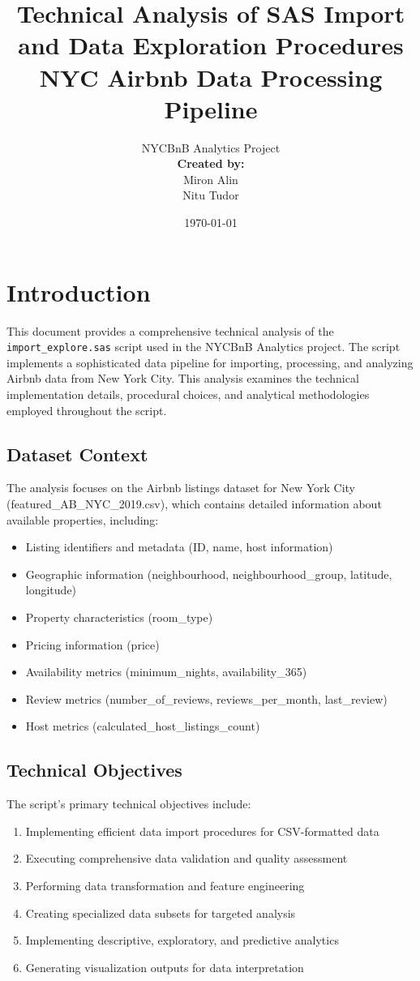 \documentclass{article}
\title{\textbf{Technical Analysis of SAS Import and Data Exploration Procedures}\\
\Large{NYC Airbnb Data Processing Pipeline}}
\author{NYCBnB Analytics Project\\
\vspace{2cm}
{\large\textbf{Created by:}\\
\vspace{0.5cm}
\large Miron Alin\\
\large Nitu Tudor}}
\date{\today}
\begin{document}
\maketitle
\tableofcontents
\newpage

\section{Introduction}
This document provides a comprehensive technical analysis of the \texttt{import\_explore.sas} script used in the NYCBnB Analytics project. The script implements a sophisticated data pipeline for importing, processing, and analyzing Airbnb data from New York City. This analysis examines the technical implementation details, procedural choices, and analytical methodologies employed throughout the script.

\subsection{Dataset Context}
The analysis focuses on the Airbnb listings dataset for New York City (featured\_AB\_NYC\_2019.csv), which contains detailed information about available properties, including:
\begin{itemize}[leftmargin=*]
    \item Listing identifiers and metadata (ID, name, host information)
    \item Geographic information (neighbourhood, neighbourhood\_group, latitude, longitude)
    \item Property characteristics (room\_type)
    \item Pricing information (price)
    \item Availability metrics (minimum\_nights, availability\_365)
    \item Review metrics (number\_of\_reviews, reviews\_per\_month, last\_review)
    \item Host metrics (calculated\_host\_listings\_count)
\end{itemize}

\subsection{Technical Objectives}
The script's primary technical objectives include:
\begin{enumerate}[leftmargin=*]
    \item Implementing efficient data import procedures for CSV-formatted data
    \item Executing comprehensive data validation and quality assessment
    \item Performing data transformation and feature engineering
    \item Creating specialized data subsets for targeted analysis
    \item Implementing descriptive, exploratory, and predictive analytics
    \item Generating visualization outputs for data interpretation
\end{enumerate}
\end{document}
